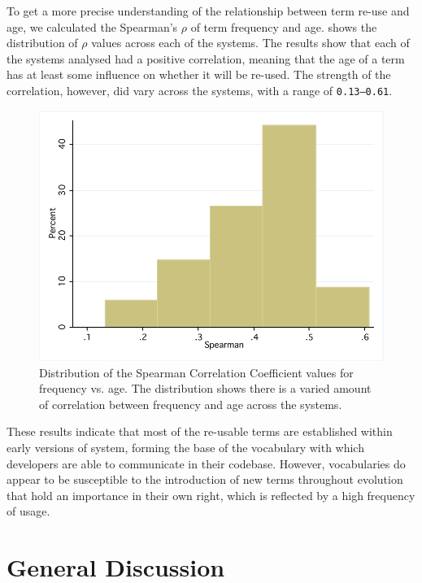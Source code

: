 To get a more precise understanding of the relationship between term re-use and age, we calculated the Spearman's $\rho$ of term frequency and age.  shows the distribution of $\rho$ values across each of the systems. The results show that each of the systems analysed had a positive correlation, meaning that the age of a term has at least some influence on whether it will be re-used. The strength of the correlation, however, did vary across the systems, with a range of \texttt{0.13--0.61}.

\begin{figure}[t]
\centering
\includegraphics[width=\textwidth]{Figures/Vocab-FrequencyAgeSpearmanDist.pdf}
\caption{Distribution of the Spearman Correlation Coefficient values for frequency vs. age. The distribution shows there is a varied amount of correlation between frequency and age across the systems.}
\label{fig:vocab-freqage-spearman-dist}
\end{figure}

These results indicate that most of the re-usable terms are established within early versions of system, forming the base of the vocabulary with which developers are able to communicate in their codebase. However, vocabularies do appear to be susceptible to the introduction of new terms throughout evolution that hold an importance in their own right, which is reflected by a high frequency of usage.



\section{General Discussion} %
\label{sec:general_discussion}

